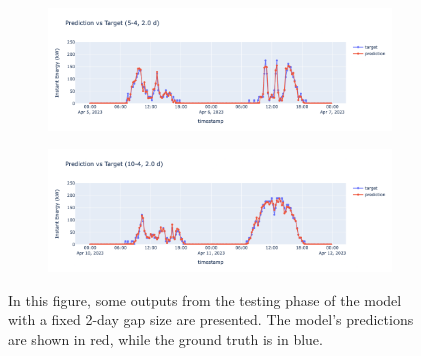 \begin{figure}[H]
	\centering
	\begin{subfigure}{\textwidth}
		\centering
		\includegraphics[width=\textwidth]{chapters/3_models/imgs/gab/eval/2days/gab2gionri54.png}
		\caption{}
	\end{subfigure}
	\begin{subfigure}{\textwidth}
		\centering
		\includegraphics[width=\textwidth]{chapters/3_models/imgs/gab/eval/2days/gab2giorni104.png}
		\caption{}
	\end{subfigure}
	\caption{In this figure, some outputs from the testing phase of the model with a fixed 2-day gap size are presented. The model's predictions are shown in red, while the ground truth is in blue.}
	\label{fig:gabsolobuchi2giorni}
\end{figure}
